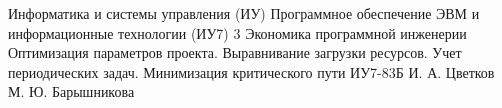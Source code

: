 \makereporttitle
{Информатика и системы управления (ИУ)}
{Программное обеспечение ЭВМ и информационные технологии (ИУ7)}
{3}
{Экономика программной инженерии}
{Оптимизация параметров проекта. Выравнивание загрузки ресурсов. Учет периодических задач. Минимизация критического пути}
{}
{ИУ7-83Б}
{И. А. Цветков}
{М. Ю. Барышникова}
{}
{}
